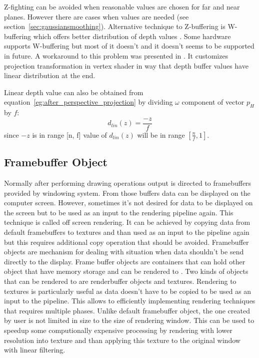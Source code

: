 Z-fighting can be avoided when reasonable values are chosen for far and near planes. However there are cases when values are needed (see section~\ref{sec:gaussiansmoothing}). Alternative technique to Z-buffering is W-buffering which offers better distribution of depth values \cite{Gregory2009}. Some hardware supports W-buffering but most of it doesn't and it doesn't seems to be supported in future. A workaround to this problem was presented in \cite{Dunlop2006}. It customizes projection transformation in vertex shader in way that depth buffer values have linear distribution at the end. 

Linear depth value can also be obtained from equation~\ref{eg:after_perspective_projection} by dividing $\omega$ component of vector $p_H$ by $f$:
\begin{equation}
\label{eq:linear_depth}
d_{lin}(z) = \frac{-z}{f}
\end{equation}
since $-z$ is in range [n, f] value of $d_{lin}(z)$ will be in range $[\frac{n}{f}, 1]$. 


\subsection{Framebuffer Object}
Normally after performing drawing operations output is directed to framebuffers provided by windowing system. From those buffers data can be displayed on the computer screen. However, sometimes it's not desired for data to be displayed on the screen but to be used as an input to the rendering pipeline again. This technique is called off screen rendering. It can be achieved by copying data from default framebuffers to textures and than used as an input to the pipeline again but this requires additional copy operation that should be avoided. Framebuffer objects are mechanism for dealing with situation when data shouldn't be send directly to the display. Frame buffer objects are containers that can hold other object that have memory storage and can be rendered to \cite[chapter~8]{OpenGLSuperbible}. Two kinds of objects that can be rendered to are renderbuffer objects and textures. Rendering to textures is particularly useful as data doesn't have to be copied to be used as an input to the pipeline. This allows to efficiently implementing rendering techniques that requires multiple phases.
Unlike default framebuffer object, the one created by user is not limited in size to the size of rendering window. This can be used to speedup some computionally expensive processing by rendering with lower resolution into texture and than applying this texture to the original window with linear filtering. 

